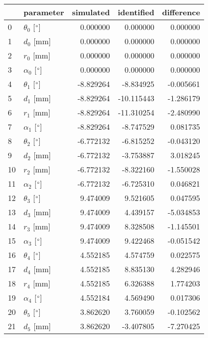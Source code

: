 \documentclass{standalone}%
\begin{document}
%
\normalsize%
\begin{tabular}{llrrr}
\toprule
{} &                 parameter & simulated & identified & difference \\
\midrule
0  &  $\theta_{0}$ [$\degree$] &  0.000000 &   0.000000 &   0.000000 \\
1  &              $d_{0}$ [mm] &  0.000000 &   0.000000 &   0.000000 \\
2  &              $r_{0}$ [mm] &  0.000000 &   0.000000 &   0.000000 \\
3  &  $\alpha_{0}$ [$\degree$] &  0.000000 &   0.000000 &   0.000000 \\
4  &  $\theta_{1}$ [$\degree$] & -8.829264 &  -8.834925 &  -0.005661 \\
5  &              $d_{1}$ [mm] & -8.829264 & -10.115443 &  -1.286179 \\
6  &              $r_{1}$ [mm] & -8.829264 & -11.310254 &  -2.480990 \\
7  &  $\alpha_{1}$ [$\degree$] & -8.829264 &  -8.747529 &   0.081735 \\
8  &  $\theta_{2}$ [$\degree$] & -6.772132 &  -6.815252 &  -0.043120 \\
9  &              $d_{2}$ [mm] & -6.772132 &  -3.753887 &   3.018245 \\
10 &              $r_{2}$ [mm] & -6.772132 &  -8.322160 &  -1.550028 \\
11 &  $\alpha_{2}$ [$\degree$] & -6.772132 &  -6.725310 &   0.046821 \\
12 &  $\theta_{3}$ [$\degree$] &  9.474009 &   9.521605 &   0.047595 \\
13 &              $d_{3}$ [mm] &  9.474009 &   4.439157 &  -5.034853 \\
14 &              $r_{3}$ [mm] &  9.474009 &   8.328508 &  -1.145501 \\
15 &  $\alpha_{3}$ [$\degree$] &  9.474009 &   9.422468 &  -0.051542 \\
16 &  $\theta_{4}$ [$\degree$] &  4.552185 &   4.574759 &   0.022575 \\
17 &              $d_{4}$ [mm] &  4.552185 &   8.835130 &   4.282946 \\
18 &              $r_{4}$ [mm] &  4.552185 &   6.326388 &   1.774203 \\
19 &  $\alpha_{4}$ [$\degree$] &  4.552184 &   4.569490 &   0.017306 \\
20 &  $\theta_{5}$ [$\degree$] &  3.862620 &   3.760059 &  -0.102562 \\
21 &              $d_{5}$ [mm] &  3.862620 &  -3.407805 &  -7.270425 \\

\end{tabular}
\end{document}
